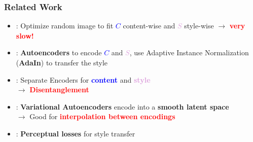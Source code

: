 \documentclass[11pt,xcolor=dvipsnames]{beamer}
\begin{document}
\begin{frame}
\frametitle{Related Work}

\begin{itemize}
	\item \textcolor{gray}{\cite{gatys}}: Optimize random image to fit \textcolor{blue}{\textbf{$C$}} content-wise and \textcolor{Plum}{\textbf{$S$}} style-wise $\rightarrow$ \textbf{\textcolor{red}{very slow!}}
	\vspace{10pt}
	
	\item \textcolor{gray}{\cite{adain}}: \textbf{Autoencoders} to encode \textcolor{blue}{\textbf{$C$}} and \textcolor{Plum}{\textbf{$S$}}, use Adaptive Instance Normalization (\textbf{AdaIn}) to transfer the style
	\vspace{10pt}
	
	\item \textcolor{gray}{\cite{disentanglement}}: Separate Encoders for \textcolor{blue}{\textbf{content}} and \textcolor{Plum}{\textbf{style}} \\ $\rightarrow$ \textcolor{red}{\textbf{Disentanglement}}
	\vspace{10pt}
	
	\item \textcolor{gray}{\cite{vae}}: \textbf{Variational Autoencoders} encode into a \textbf{smooth latent space} \\
	$\rightarrow$ Good for \textcolor{red}{\textbf{interpolation between encodings}}
	\vspace{10pt}
	
	\item \textcolor{gray}{\cite{johnson}}: \textbf{Perceptual losses} for style transfer
	
\end{itemize}

\end{frame}
\end{document}
